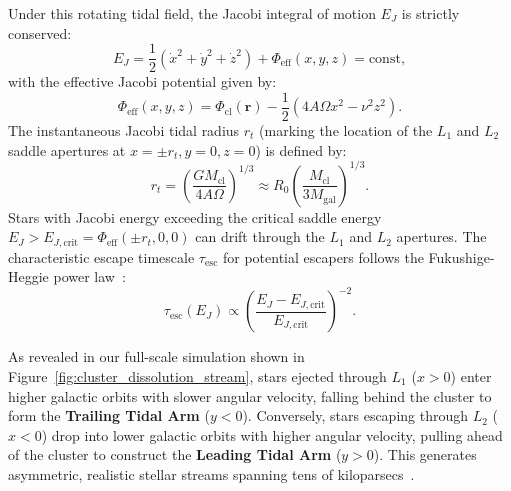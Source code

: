 \documentclass[preprint,12pt,3p]{elsarticle}
\begin{document}
Under this rotating tidal field, the Jacobi integral of motion $E_J$ is strictly conserved:
\begin{equation}
E_J = \frac{1}{2} \left( \dot{x}^2 + \dot{y}^2 + \dot{z}^2 \right) + \Phi_{\mathrm{eff}}(x, y, z) = \mathrm{const},
\label{eq:jacobi_energy}
\end{equation}
with the effective Jacobi potential given by:
\begin{equation}
\Phi_{\mathrm{eff}}(x, y, z) = \Phi_{\mathrm{cl}}(\bm{r}) - \frac{1}{2} \left( 4 A \Omega x^2 - \nu^2 z^2 \right).
\label{eq:effective_jacobi_potential}
\end{equation}
The instantaneous Jacobi tidal radius $r_t$ (marking the location of the $L_1$ and $L_2$ saddle apertures at $x = \pm r_t, y = 0, z = 0$) is defined by:
\begin{equation}
r_t = \left( \frac{G M_{\mathrm{cl}}}{4 A \Omega} \right)^{1/3} \approx R_0 \left( \frac{M_{\mathrm{cl}}}{3 M_{\mathrm{gal}}} \right)^{1/3}.
\label{eq:jacobi_radius_formula}
\end{equation}
Stars with Jacobi energy exceeding the critical saddle energy $E_J > E_{J, \mathrm{crit}} = \Phi_{\mathrm{eff}}(\pm r_t, 0, 0)$ can drift through the $L_1$ and $L_2$ apertures. The characteristic escape timescale $\tau_{\mathrm{esc}}$ for potential escapers follows the Fukushige-Heggie power law~\cite{fukushige2000timescale}:
\begin{equation}
\tau_{\mathrm{esc}}(E_J) \propto \left( \frac{E_J - E_{J, \mathrm{crit}}}{E_{J, \mathrm{crit}}} \right)^{-2}.
\label{eq:fukushige_timescale}
\end{equation}

As revealed in our full-scale simulation shown in Figure~\ref{fig:cluster_dissolution_stream}, stars ejected through $L_1$ ($x > 0$) enter higher galactic orbits with slower angular velocity, falling behind the cluster to form the \textbf{Trailing Tidal Arm} ($y < 0$). Conversely, stars escaping through $L_2$ ($x < 0$) drop into lower galactic orbits with higher angular velocity, pulling ahead of the cluster to construct the \textbf{Leading Tidal Arm} ($y > 0$). This generates asymmetric, realistic stellar streams spanning tens of kiloparsecs~\cite{kuepper2010structure,weatherford2024stellar}.
\end{document}
